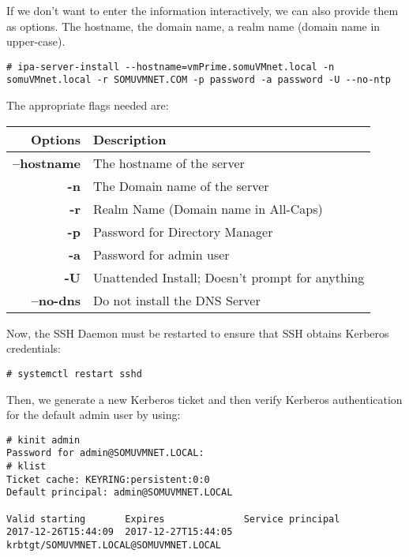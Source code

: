 \noindent
If we don't want to enter the information interactively, we can also provide them as options. The hostname, the domain name, a realm name (domain name in upper-case). 

\vspace{-15pt}
\begin{verbatim}
# ipa-server-install --hostname=vmPrime.somuVMnet.local -n somuVMnet.local -r SOMUVMNET.COM -p password -a password -U --no-ntp
\end{verbatim}
\vspace{-10pt}

\noindent
The appropriate flags needed are:

\noindent
\begin{tabular}{rM{0.85}}
	\toprule
	\textbf{Options} &\textbf{Description} \\
	\midrule
	\textbf{--hostname}	&The hostname of the server\\
	\textbf{-n}	&The Domain name of the server\\
	\textbf{-r}	&Realm Name (Domain name in All-Caps)\\
	\textbf{-p}	&Password for Directory Manager\\
	\textbf{-a}	&Password for admin user\\
	\textbf{-U}	&Unattended Install; Doesn't prompt for anything\\
	\textbf{--no-dns}	&Do not install the DNS Server\\
	\bottomrule
\end{tabular}

\noindent
Now, the SSH Daemon must be restarted to ensure that SSH obtains Kerberos credentials:

\vspace{-15pt}
\begin{verbatim}
# systemctl restart sshd
\end{verbatim}
\vspace{-10pt}

\noindent
Then, we generate a new Kerberos ticket and then verify Kerberos authentication for the default admin user by using: 

\vspace{-15pt}
\begin{verbatim}
# kinit admin
Password for admin@SOMUVMNET.LOCAL: 
# klist
Ticket cache: KEYRING:persistent:0:0
Default principal: admin@SOMUVMNET.LOCAL

Valid starting       Expires              Service principal
2017-12-26T15:44:09  2017-12-27T15:44:05  krbtgt/SOMUVMNET.LOCAL@SOMUVMNET.LOCAL
\end{verbatim}
\vspace{-10pt}


